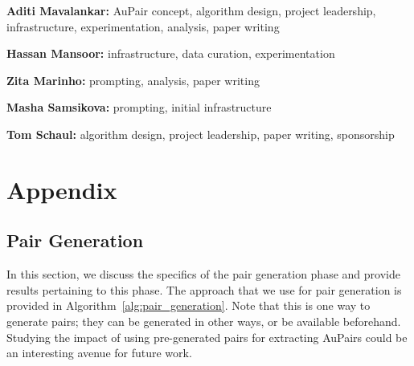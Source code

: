 \documentclass[11pt, a4paper, logo, copyright]{googledeepmind}
\def\aupair/{\textcolor{golden}{Au}Pair}
\def\aupairs/{\textcolor{golden}{Au}Pairs}
\begin{document}
\textbf{Aditi Mavalankar:} \aupair/ concept, algorithm design, project leadership, infrastructure, experimentation, analysis, paper writing

\noindent\textbf{Hassan Mansoor:} infrastructure, data curation, experimentation

\noindent\textbf{Zita Marinho:} prompting, analysis, paper writing

\noindent\textbf{Masha Samsikova:} prompting, initial infrastructure

\noindent\textbf{Tom Schaul:} algorithm design, project leadership, paper writing, sponsorship


\typeout{}


\clearpage

\appendix
\section{Appendix}
\label{sec:appendix}

\subsection{Pair Generation}

In this section, we discuss the specifics of the pair generation phase and provide results pertaining to this phase. The approach that we use for pair generation is provided in Algorithm~\ref{alg:pair_generation}. Note that this is one way to generate pairs; they can be generated in other ways, or be available beforehand. Studying the impact of using pre-generated pairs for extracting \aupairs/ could be an interesting avenue for future work.
\end{document}
